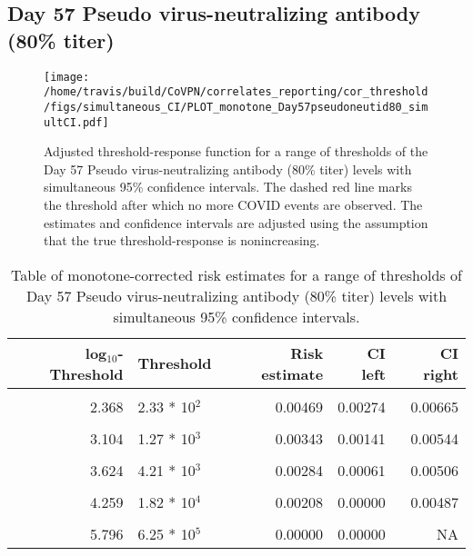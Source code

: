\documentclass[]{book}
\theoremstyle{definition}
\theoremstyle{definition}
\theoremstyle{definition}
\newcommand{\1}{\mathbbm{1}}
\begin{document}
\clearpage

\clearpage

\clearpage

\hypertarget{day-57-pseudo-virus-neutralizing-antibody-80-titer-3}{%
\subsection{Day 57 Pseudo virus-neutralizing antibody (80\% titer)}\label{day-57-pseudo-virus-neutralizing-antibody-80-titer-3}}

\begin{figure}[H]
\centering
\texttt{[image: /home/travis/build/CoVPN/correlates\_reporting/cor\_threshold/figs/simultaneous\_CI/PLOT\_monotone\_Day57pseudoneutid80\_simultCI.pdf]}
\caption{Adjusted threshold-response function for a range of thresholds of the
  Day 57 Pseudo virus-neutralizing antibody (80\% titer) levels with simultaneous 95\% confidence intervals. The dashed red line marks the threshold after which no more COVID events are observed. The estimates and confidence intervals are adjusted using the assumption that the true threshold-response is nonincreasing.}
\end{figure}
\begin{table}[!h]

\caption{\label{tab:unnamed-chunk-401}Table of monotone-corrected risk estimates for a range of thresholds of Day 57 Pseudo virus-neutralizing antibody (80\% titer) levels with simultaneous 95\% confidence intervals.}
\centering
\begin{tabular}[t]{rlrrr}
\toprule
log$_{10}$-Threshold & Threshold & Risk estimate & CI left & CI right\\
\midrule
\cellcolor{gray!6}{1.289} & \cellcolor{gray!6}{1.95 * 10$^1$} & \cellcolor{gray!6}{0.00514} & \cellcolor{gray!6}{0.00323} & \cellcolor{gray!6}{0.00706}\\
2.368 & 2.33 * 10$^2$ & 0.00469 & 0.00274 & 0.00665\\
\cellcolor{gray!6}{2.755} & \cellcolor{gray!6}{5.69 * 10$^2$} & \cellcolor{gray!6}{0.00428} & \cellcolor{gray!6}{0.00229} & \cellcolor{gray!6}{0.00626}\\
3.104 & 1.27 * 10$^3$ & 0.00343 & 0.00141 & 0.00544\\
\cellcolor{gray!6}{3.373} & \cellcolor{gray!6}{2.36 * 10$^3$} & \cellcolor{gray!6}{0.00312} & \cellcolor{gray!6}{0.00108} & \cellcolor{gray!6}{0.00516}\\
3.624 & 4.21 * 10$^3$ & 0.00284 & 0.00061 & 0.00506\\
\cellcolor{gray!6}{3.909} & \cellcolor{gray!6}{8.11 * 10$^3$} & \cellcolor{gray!6}{0.00243} & \cellcolor{gray!6}{0.00013} & \cellcolor{gray!6}{0.00473}\\
4.259 & 1.82 * 10$^4$ & 0.00208 & 0.00000 & 0.00487\\
\cellcolor{gray!6}{4.676} & \cellcolor{gray!6}{4.74 * 10$^4$} & \cellcolor{gray!6}{0.00208} & \cellcolor{gray!6}{0.00000} & \cellcolor{gray!6}{0.00657}\\
5.796 & 6.25 * 10$^5$ & 0.00000 & 0.00000 & NA\\
\bottomrule
\end{tabular}
\end{table}
\end{document}
